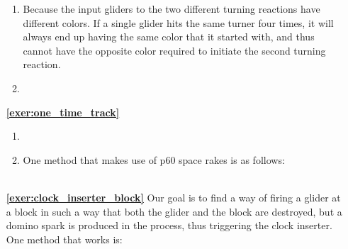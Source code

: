 \begin{multicols}{2}
\begin{itemize}[leftmargin=0em]
\begin{enumerate}[leftmargin=1.5em,label=\bf\color{ocre}(\alph*)]
			\item Because the input gliders to the two different turning reactions have different colors. If a single glider hits the same turner four times, it will always end up having the same color that it started with, and thus cannot have the opposite color required to initiate the second turning reaction.
			
			\item {} \\
		\end{enumerate}
		
		
		\item[\bf\color{ocre}\sffamily\ref{exer:one_time_track}]
		\begin{enumerate}[leftmargin=1.5em,label=\bf\color{ocre}(\alph*)]
			\item {} \\
			
			\item One method that makes use of p$60$ space rakes is as follows:\\[-0.6em]
			
			 \\
		\end{enumerate}
		
		
		\item[\bf\color{ocre}\sffamily\ref{exer:clock_inserter_block}] Our goal is to find a way of firing a glider at a block in such a way that both the glider and the block are destroyed, but a domino spark is produced in the process, thus triggering the clock inserter. One method that works is:\\[-0.6em]
		
		 \\
		

\end{itemize}
\end{multicols}
